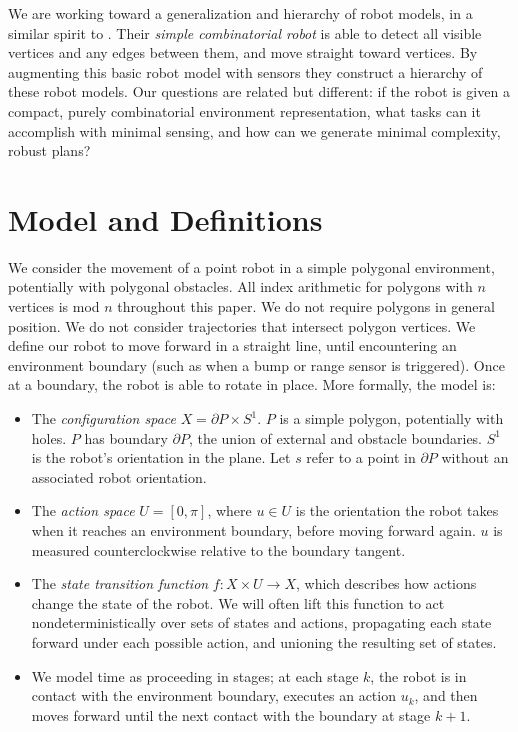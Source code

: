 \documentclass[sageh,times,Review]{sagej}
\begin{document}
We are working toward a generalization and hierarchy of robot models, in a
similar spirit to \cite{brunner2008simple}. Their {\em simple
combinatorial robot} is able to detect all visible vertices and any edges
between them, and move straight toward vertices. By augmenting this basic robot model
with sensors they construct a hierarchy of these robot models. Our questions are related but 
different: if the robot is given a compact, purely combinatorial environment representation, 
what tasks can it accomplish with minimal sensing, and how can we generate
minimal complexity, robust plans?



\section{Model and Definitions} \label{secmodel}

We consider the movement of a point robot in a simple polygonal environment,
potentially with polygonal obstacles. All index arithmetic for polygons with $n$ vertices is mod $n$ 
throughout this paper. We do not require polygons in general position. We do
not consider trajectories that intersect polygon vertices. We define our robot to move forward in a straight line, until
encountering an environment boundary (such as when a bump or range sensor is
triggered). Once at a boundary, the robot is able to rotate in place. More formally, the model is:
\begin{itemize}
\item The \emph{configuration space} $X = \partial P \times S^1$. $P$ is a simple polygon,
potentially with holes. $P$ has boundary $\partial P$, the union of external
and obstacle boundaries. $S^1$ is the robot's orientation in the plane. Let $s$ refer to a point in $\partial P$ without an associated robot orientation.
\item The \emph{action space} $U = [0,\pi]$, where $u \in U$ is the
orientation the robot takes when it reaches an environment boundary, before
moving forward again. $u$ is measured counterclockwise
relative to the boundary tangent. 
\item The \emph{state transition function} $f: X \times U \to X$, which
describes how actions change the state of the robot. We will often lift this function to act nondeterministically over sets
of states and actions, propagating each state forward under each possible action,
and unioning the resulting set of states. 
\item We model time as proceeding in stages; at each stage $k$, the robot
is in contact with the environment boundary, executes an action $u_k$, and then
moves forward until the next contact with the boundary at stage $k+1$.
\end{itemize}
\end{document}
